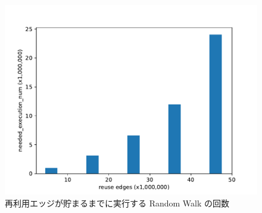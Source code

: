 \begin{figure}[t]
    \centering
    \includegraphics[scale=0.8]{figure/AR_cache_RWer_num.pdf}
    \caption{再利用エッジが貯まるまでに実行する Random Walk の回数}
    \label{再利用エッジが貯まるまでに実行する Random Walk の回数}
\end{figure}